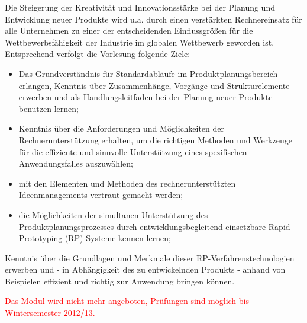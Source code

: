 \begin{module}
\begin{content}
Die Steigerung der Kreativität und Innovationsstärke bei der Planung und Entwicklung neuer Produkte wird u.a. durch einen verstärkten Rechnereinsatz für alle Unternehmen zu einer der entscheidenden Einflussgrößen für die Wettbewerbsfähigkeit der Industrie im globalen Wettbewerb geworden ist. \newline
\newline
 Entsprechend verfolgt die Vorlesung folgende Ziele:

 \begin{itemize}\item Das Grundverständnis für Standardabläufe im Produktplanungsbereich erlangen, Kenntnis über Zusammenhänge, Vorgänge und Strukturelemente erwerben und als Handlungsleitfaden bei der Planung neuer Produkte benutzen lernen;  \item Kenntnis über die Anforderungen und Möglichkeiten der Rechnerunterstützung erhalten, um die richtigen Methoden und Werkzeuge für die effiziente und sinnvolle Unterstützung eines spezifischen Anwendungsfalles auszuwählen;  \item mit den Elementen und Methoden des rechnerunterstützten Ideenmanagements vertraut gemacht werden;  \item die Möglichkeiten der simultanen Unterstützung des Produktplanungsprozesses durch entwicklungsbegleitend einsetzbare Rapid Prototyping (RP)-Systeme kennen lernen;  \end{itemize}

Kenntnis über die Grundlagen und Merkmale dieser RP-Verfahrenstechnologien erwerben und - in Abhängigkeit des zu entwickelnden Produkts - anhand von Beispielen effizient und richtig zur Anwendung bringen können.


\end{content}

\begin{remarks}\textcolor{red}{Das Modul wird nicht mehr angeboten, Prüfungen sind möglich bis Wintersemester 2012/13.}

\end{remarks}

\end{module}

